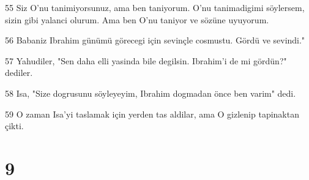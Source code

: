 \par 55 Siz O'nu tanimiyorsunuz, ama ben taniyorum. O'nu tanimadigimi söylersem, sizin gibi yalanci olurum. Ama ben O'nu taniyor ve sözüne uyuyorum.
\par 56 Babaniz Ibrahim günümü görecegi için sevinçle cosmustu. Gördü ve sevindi."
\par 57 Yahudiler, "Sen daha elli yasinda bile degilsin. Ibrahim'i de mi gördün?" dediler.
\par 58 Isa, "Size dogrusunu söyleyeyim, Ibrahim dogmadan önce ben varim" dedi.
\par 59 O zaman Isa'yi taslamak için yerden tas aldilar, ama O gizlenip tapinaktan çikti.

\chapter{9}

